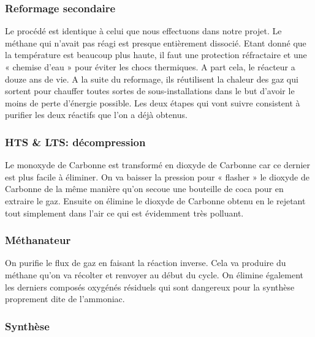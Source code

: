 \subsubsection{Reformage secondaire}

Le procédé est identique à celui que nous effectuons dans notre projet. Le méthane qui n’avait pas réagi est presque
entièrement dissocié. Etant donné que la température est beaucoup plus haute, il faut une protection réfractaire et une
« chemise d’eau » pour éviter les chocs thermiques. A part cela, le réacteur a douze ans de vie.
A la suite du reformage, ils réutilisent la chaleur des gaz qui sortent pour chauffer toutes sortes de sous-installations
dans le but d’avoir le moins de perte d’énergie possible. Les deux étapes qui vont suivre consistent à purifier les deux 
réactifs que l’on a déjà obtenus. 

\subsubsection{HTS \& LTS: décompression}

Le monoxyde de Carbonne est transformé en dioxyde de Carbonne car ce dernier est plus facile à éliminer. On va baisser 
la pression pour « flasher » le dioxyde de Carbonne de la même manière qu’on secoue une bouteille de coca pour en extraire
le gaz. Ensuite on élimine le dioxyde de Carbonne obtenu en le rejetant tout simplement dans l’air ce qui est évidemment
très polluant. 

\subsubsection{Méthanateur}

On purifie le flux de gaz en faisant la réaction inverse. Cela va produire du méthane qu’on va récolter et renvoyer 
au début du cycle.  On élimine également les derniers composés oxygénés résiduels qui sont dangereux pour la synthèse 
proprement dite de l’ammoniac.

\subsubsection{Synthèse}


